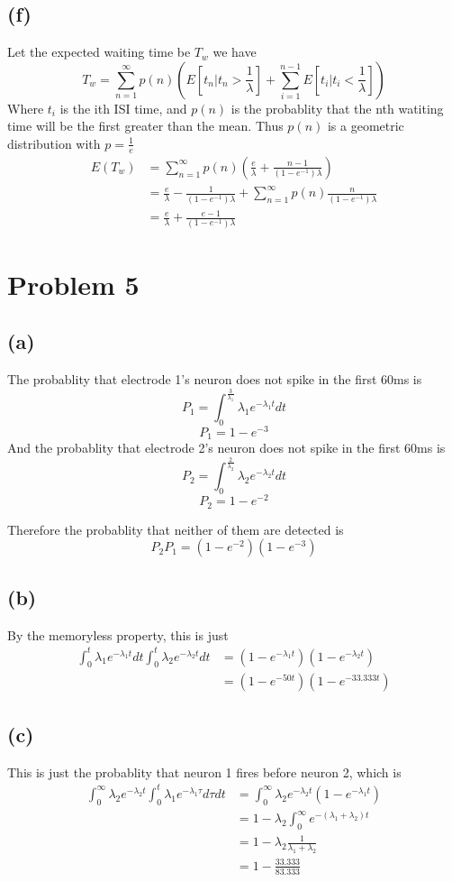 \documentclass[12pt]{article}
\begin{document}
\subsection*{(f)}
Let the expected waiting time be $T_w$ we have
$$T_w=\sum_{n=1}^\infty p(n) \left(E[t_n|t_n>\frac{1}{\lambda}]+\sum_{i=1}^{n-1}E[t_i|t_i<\frac{1}{\lambda}]\right)$$
Where $t_i$ is the ith ISI time, and $p(n)$ is the probablity that the nth watiting time will be the
first greater than the mean. Thus $p(n)$ is a geometric distribution with $p=\frac{1}{e}$
\begin{align*}
    E(T_w)&=
    \sum_{n=1}^{\infty} p(n)\left(\frac{e}{\lambda}+\frac{n-1}{(1-e^{-1})\lambda}\right)\\
    &=\frac{e}{\lambda}-\frac{1}{(1-e^{-1})\lambda}+\sum_{n=1}^{\infty} p(n)\frac{n}{(1-e^{-1})\lambda}\\
    &=\boxed{\frac{e}{\lambda}+\frac{e-1}{(1-e^{-1})\lambda}}
\end{align*}
\section*{Problem 5}
\subsection*{(a)}
The probablity that electrode 1's neuron does not spike in the first 60ms is 
$$P_{1}=\int_{0}^{\frac{3}{\lambda_1}}\lambda_1 e^{-\lambda_1 t}dt$$
$$P_{1}=1-e^{-3}$$
And the probablity that electrode 2's neuron does not spike in the first 60ms is 
$$P_{2}=\int_{0}^{\frac{2}{\lambda_2}}\lambda_2 e^{-\lambda_2 t}dt$$
$$P_{2}=1-e^{-2}$$

Therefore the probablity that neither of them are detected is 
$$P_{2}P_{1}=(1-e^{-2})(1-e^{-3})$$
\subsection*{(b)}
By the memoryless property, this is just
\begin{align*}
    \int_{0}^{t}\lambda_1 e^{-\lambda_1 t}dt\int_{0}^{t}\lambda_2 e^{-\lambda_2 t}dt
    &=(1-e^{-\lambda_1t})(1-e^{-\lambda_2t})\\
    &=\boxed{(1-e^{-50t})(1-e^{-33.333t})}
\end{align*}
\subsection*{(c)}
This is just the probablity that neuron 1 fires before
neuron 2, which is 
\begin{align*}
    \int_{0}^{\infty}\lambda_2e^{-\lambda_2 t}\int_{0}^{t}\lambda_1e^{-\lambda_1 \tau}d\tau dt
    &=\int_{0}^{\infty}\lambda_2e^{-\lambda_2 t}(1-e^{-\lambda_1 t})\\
    &=1-\lambda_2\int_{0}^{\infty}e^{-(\lambda_1+\lambda_2) t}\\
    &=1-\lambda_2\frac{1}{\lambda_1+\lambda_2}\\
    &=\boxed{1-\frac{33.333}{83.333}}
\end{align*}
\end{document}

